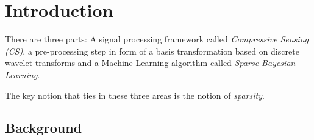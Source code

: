 \chapter{Introduction}

There are three parts: A signal processing framework called \emph{Compressive Sensing (CS)}, a pre-processing step in form of a basis transformation based on discrete wavelet transforms and a Machine Learning algorithm called \emph{Sparse Bayesian Learning}.

The key notion that ties in these three areas is the notion of \emph{sparsity}.

\section*{Background}
